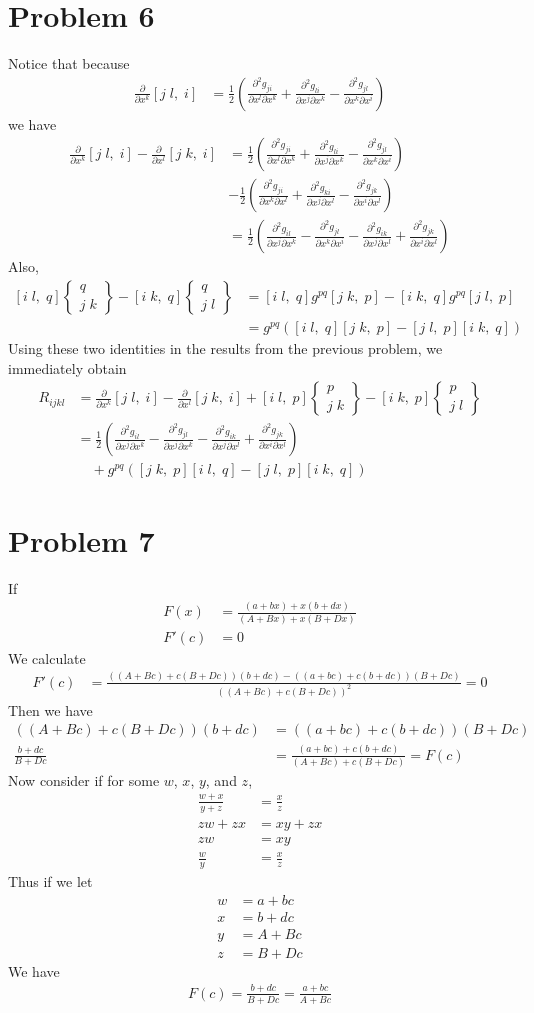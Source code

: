 \documentclass[12pt]{article}
\newcommand{\eq}[1]{\begin{align*}#1\end{align*}}
\newcommand{\p}[2]{\frac{\partial#1}{\partial#2}}
\newcommand{\pp}[3]{\frac{\partial^2#1}{\partial#2\partial#3}}
\newcommand{\crsf}[3]{\left[#1\;#2,\;#3\right]}
\newcommand{\crss}[3]{\left\{\begin{array}{c}#1\\#2\;#3\end{array}\right\}}
\begin{document}
\section*{Problem 6}
Notice that because
\eq{
	\p{}{x^k}\crsf{j}{l}{i} &= \frac{1}{2}\left(\pp{g_{ji}}{x^l}{x^k} + \pp{g_{li}}{x^j}{x^k} - \pp{g_{jl}}{x^k}{x^i}\right)
}
we have
\eq{
	\p{}{x^k}\crsf{j}{l}{i} - \p{}{x^l}\crsf{j}{k}{i} &= \frac{1}{2}\left(\pp{g_{ji}}{x^l}{x^k} + \pp{g_{li}}{x^j}{x^k} - \pp{g_{jl}}{x^k}{x^i}\right)\\
	&- \frac{1}{2}\left(\pp{g_{ji}}{x^k}{x^l} + \pp{g_{ki}}{x^j}{x^l} - \pp{g_{jk}}{x^i}{x^l}\right)\\
	&= \frac{1}{2}\left(\pp{g_{il}}{x^j}{x^k} - \pp{g_{jl}}{x^k}{x^i} - \pp{g_{ik}}{x^j}{x^l} + \pp{g_{jk}}{x^i}{x^l}\right)
}
Also,
\eq{
	\crsf{i}{l}{q}\crss{q}{j}{k} - \crsf{i}{k}{q}\crss{q}{j}{l} &= \crsf{i}{l}{q}g^{pq}\crsf{j}{k}{p} - \crsf{i}{k}{q}g^{pq}\crsf{j}{l}{p}\\
	&= g^{pq}(\crsf{i}{l}{q}\crsf{j}{k}{p} - \crsf{j}{l}{p}\crsf{i}{k}{q})
}
Using these two identities in the results from the previous problem, we immediately obtain
\eq{
	R_{ijkl} &= \p{}{x^k}\crsf{j}{l}{i} - \p{}{x^l}\crsf{j}{k}{i} + \crsf{i}{l}{p}\crss{p}{j}{k} - \crsf{i}{k}{p}\crss{p}{j}{l}\\
	&= \frac{1}{2}\left(\pp{g_{il}}{x^j}{x^k} - \pp{g_{jl}}{x^j}{x^k} - \pp{g_{ik}}{x^j}{x^l} + \pp{g_{jk}}{x^i}{x^l}\right)\\
	&\quad + g^{pq}(\crsf{j}{k}{p}\crsf{i}{l}{q} - \crsf{j}{l}{p}\crsf{i}{k}{q})
}
\section*{Problem 7}
If
\eq{
	F(x) &= \frac{(a + bx) + x(b + dx)}{(A + Bx) + x(B + Dx)}\\
	F'(c) &= 0
}
We calculate
\eq{
	F'(c) &= \frac{((A + Bc) + c(B + Dc))(b + dc) - ((a + bc) + c(b + dc))(B + Dc)}{((A + Bc) + c(B + Dc))^2} = 0
}
Then we have
\eq{
	((A + Bc) + c(B + Dc))(b + dc) &= ((a + bc) + c(b + dc))(B + Dc)\\
	\frac{b + dc}{B + Dc} &= \frac{(a + bc) + c(b + dc)}{(A + Bc) + c(B + Dc)} = F(c)
}
Now consider if for some $w$, $x$, $y$, and $z$,
\eq{
	\frac{w + x}{y + z} &= \frac{x}{z}\\
	zw + zx &= xy + zx\\
	zw &= xy\\
	\frac{w}{y} &= \frac{x}{z}
}
Thus if we let
\eq{
	w &= a + bc\\
	x &= b + dc\\
	y &= A + Bc\\
	z &= B + Dc
}
We have
\eq{
	F(c) = \frac{b + dc}{B + Dc} = \frac{a + bc}{A + Bc}
}
\end{document}
